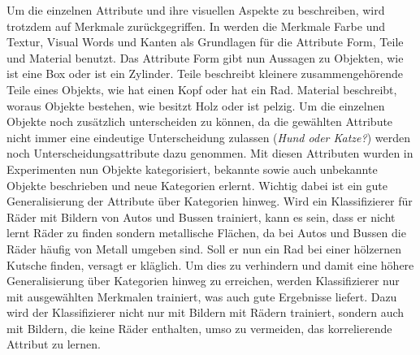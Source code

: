 Um die einzelnen Attribute und ihre visuellen Aspekte zu beschreiben, wird trotzdem auf Merkmale zurückgegriffen. In \cite{descObjbyAtr} werden die Merkmale Farbe und Textur, Visual Words und Kanten als Grundlagen für die Attribute Form, Teile und Material benutzt. Das Attribute Form gibt nun Aussagen zu Objekten, wie \glqq ist eine Box\grqq \xspace oder \glqq ist ein Zylinder\grqq. Teile beschreibt kleinere zusammengehörende Teile eines Objekts, wie \glqq hat einen Kopf\grqq \xspace oder \glqq hat ein Rad\grqq. Material beschreibt, woraus Objekte bestehen, wie \glqq besitzt Holz\grqq \xspace oder \glqq ist pelzig\grqq. Um die einzelnen Objekte noch zusätzlich unterscheiden zu können, da die gewählten Attribute nicht immer eine eindeutige Unterscheidung zulassen (\textit{Hund oder Katze?}) werden noch Unterscheidungsattribute dazu genommen. Mit diesen Attributen wurden in Experimenten nun Objekte kategorisiert, bekannte sowie auch unbekannte Objekte beschrieben und neue Kategorien erlernt. Wichtig dabei ist ein gute Generalisierung der Attribute über Kategorien hinweg. Wird ein Klassifizierer für Räder mit Bildern von Autos und Bussen trainiert, kann es sein, dass er nicht lernt Räder zu finden sondern metallische Flächen, da bei Autos und Bussen die Räder häufig von Metall umgeben sind. Soll er nun ein Rad bei einer hölzernen Kutsche finden, versagt er kläglich. Um dies zu verhindern und damit eine höhere Generalisierung über Kategorien hinweg zu erreichen, werden Klassifizierer nur mit ausgewählten Merkmalen trainiert, was auch gute Ergebnisse liefert. Dazu wird der Klassifizierer nicht nur mit Bildern mit Rädern trainiert, sondern auch mit Bildern, die keine Räder enthalten, umso zu vermeiden, das korrelierende Attribut zu lernen.   \par    

